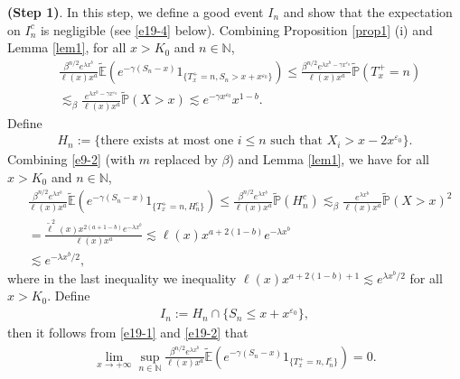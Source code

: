 \documentclass[11pt]{article}
\numberwithin{equation}{section}
\begin{document}
\noindent
{\bf(Step 1)}.  In this step, we define a good event $I_n$ and show that the expectation on $I_n^c$ is negligible (see \eqref{e19-4} below).
Combining Proposition \ref{prop1} (i) and Lemma \ref{lem1},  for all $x>K_0$ and $n\in \mathbb{N}$,
\begin{align}\label{e19-1}
		& \frac{  \beta^{n/2} e^{\lambda x^b}}{\ell(x) x^a } \widetilde{\mathbb{E}}\left(e^{-\gamma (S_n-x)}1_{\{T_x^+=n, S_n> x+ x^{\varepsilon_0}\}}\right)  \leq 	\frac{  \beta^{n/2} e^{\lambda x^b-\gamma x^{\varepsilon_0}}}{\ell(x) x^a   }\widetilde{\mathbb{P}}\left(T_x^+=n\right)  \nonumber\\
		&\lesssim_\beta 	\frac{ e^{\lambda x^b-\gamma x^{\varepsilon_0}} }{\ell(x) x^a } \widetilde{\mathbb{P}}\left(X>x\right) \lesssim e^{-\gamma x^{\varepsilon_0} }x^{1-b}.
\end{align}
 Define 
\begin{align}\label{def-of-H}
	H_n:= \{\mbox{there exists at most one }i \leq n \mbox{ such that } X_i>x-2x^{\varepsilon_0}  \}.
\end{align}
Combining  \eqref{e9-2} (with $m$ replaced by $\beta$) and Lemma \ref{lem1}, we have for all $x>K_0$ and $n\in \mathbb{N}$, 
\begin{align}\label{e19-2}
		& \frac{  \beta^{n/2}e^{\lambda x^b} }{\ell(x) x^a } \widetilde{\mathbb{E}}\left(e^{-\gamma (S_n-x)}1_{\{T_x^+=n, H_n^c\}}\right)  \leq 	\frac{  \beta^{n/2} e^{\lambda x^b}}{\ell(x) x^a } \widetilde{\mathbb{P}}\left(H_n^c\right)  \lesssim_\beta \frac{  e^{\lambda x^b} }{\ell(x) x^a } \widetilde{\mathbb{P}}\left(X>x\right)^2 \nonumber\\
		& = \frac{   \widetilde{\ell}^2(x) x^{2(a+1-b)} e^{-\lambda x^b}}{\ell(x) x^a  } \lesssim \ell(x) x^{a+2(1-b)} e^{-\lambda x^b} \nonumber\\
		&\lesssim e^{-\lambda x^b /2}, 
\end{align}
where in the last inequality we inequality $\ell(x) x^{a+2(1-b)+1}\lesssim e^{\lambda x^b /2}$ for all $x>K_0$. 
Define 
\begin{align}\label{def-of-I-n}
		I_n:= H_n\cap \{S_n\leq x+x^{\varepsilon_0}\} ,
\end{align}
then it follows from \eqref{e19-1} and  \eqref{e19-2}  that 
\begin{align}\label{e19-4}
	\lim_{x\to+\infty} \sup_{n\in \mathbb{N}}\frac{ \beta^{n/2}e^{\lambda x^b} }{\ell(x) x^a } \widetilde{\mathbb{E}}\left(e^{-\gamma (S_n-x)}1_{\{T_x^+=n, I_n^c\}}\right)=0. 
\end{align}
\end{document}
